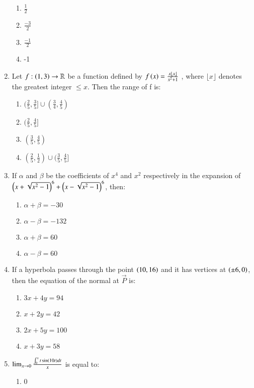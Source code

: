 \documentclass[journal,12pt,onecolumn]{IEEEtran}
\theoremstyle{remark}
\begin{document}
\begin{enumerate}
    \begin{enumerate}
        \item $\frac{1}{2}$
        \item $\frac{-3}{2}$
        \item $\frac{-1}{2}$
        \item -1
    \end{enumerate}
    \item Let $f : \left(1,3\right) \rightarrow \mathbb{R}$ be a function defined by $f\left(x\right) = \frac{x\lfloor x \rfloor}{x^2+1}$ , where $\lfloor x \rfloor$ denotes the greatest integer $\leq x$. Then the range of f is:
    \begin{enumerate}
        \item $( \frac{2}{5} , \frac{3}{5} ] \cup ( \frac{3}{4} , \frac{4}{5} )$
        \item $( \frac{2}{5} , \frac{4}{5} ]$
        \item $( \frac{3}{5} , \frac{4}{5} )$
        \item $( \frac{2}{5} , \frac{1}{2} ) \cup ( \frac{3}{5} , \frac{4}{5} ]$
    \end{enumerate}
    \item If $\alpha$ and $\beta$ be the coefficients of $x^4$  and $x^2$ respectively in the expansion of $\left(x+\sqrt{x^2-1}\right)^6 + \left(x-\sqrt{x^2-1}\right)^6$, then:
    \begin{enumerate}
        \item $\alpha + \beta = -30 $
        \item $\alpha - \beta = -132$
       \item $\alpha + \beta = 60 $
        \item $\alpha - \beta = 60$
    \end{enumerate}
    \item  If a hyperbola passes through the point $\left(10, 16\right)$ and it has vertices at $\left(\pm 6, 0\right)$, then the equation of the normal at $\vec{P}$ is:
    \begin{enumerate}
        \item $3x+4y=94$
        \item $x+2y=42$
        \item $2x+5y=100$
        \item $x+3y=58$
    \end{enumerate}
    \item $\lim_{x \to 0} \frac{\int^{x}_0 t\sin\left(10t\right)dt}{x}$ is equal to:
    \begin{enumerate}
        \item 0

\end{enumerate}
\end{enumerate}
\end{document}
